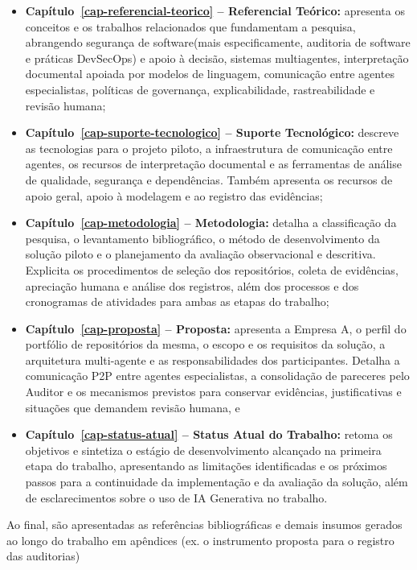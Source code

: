 \begin{itemize}
    \item \textbf{Capítulo~\ref{cap-referencial-teorico} -- Referencial Teórico:} apresenta os conceitos e os trabalhos relacionados que fundamentam a pesquisa, abrangendo segurança de software(mais especificamente, auditoria de software e práticas DevSecOps) e apoio à decisão, sistemas multiagentes, interpretação documental apoiada por modelos de linguagem, comunicação entre agentes especialistas, políticas de governança, explicabilidade, rastreabilidade e revisão humana;

    \item \textbf{Capítulo~\ref{cap-suporte-tecnologico} -- Suporte Tecnológico:} descreve as tecnologias para o projeto piloto, a infraestrutura de comunicação entre agentes, os recursos de interpretação documental e as ferramentas de análise de qualidade, segurança e dependências. Também apresenta os recursos de apoio geral, apoio à modelagem e ao registro das evidências;

    \item \textbf{Capítulo~\ref{cap-metodologia} -- Metodologia:} detalha a classificação da pesquisa, o levantamento bibliográfico, o método de desenvolvimento da solução piloto e o planejamento da avaliação observacional e descritiva. Explicita os procedimentos de seleção dos repositórios, coleta de evidências, apreciação humana e análise dos registros, além dos processos e dos cronogramas de atividades para ambas as etapas do trabalho;

    \item \textbf{Capítulo~\ref{cap-proposta} -- Proposta:} apresenta a Empresa A, o perfil do portfólio de repositórios da mesma, o escopo e os requisitos da solução, a arquitetura multi-agente e as responsabilidades dos participantes. Detalha a comunicação P2P entre agentes especialistas, a consolidação de pareceres pelo Auditor e os mecanismos previstos para conservar evidências, justificativas e situações que demandem revisão humana, e

    \item \textbf{Capítulo~\ref{cap-status-atual} -- Status Atual do Trabalho:} retoma os objetivos e sintetiza o estágio de desenvolvimento alcançado na primeira etapa do trabalho, apresentando as limitações identificadas e os próximos passos para a continuidade da implementação e da avaliação da solução, além de esclarecimentos sobre o uso de IA Generativa no trabalho.
\end{itemize}

Ao final, são apresentadas as referências bibliográficas e demais insumos gerados ao longo do trabalho em apêndices (ex. o instrumento proposta para o registro das auditorias)